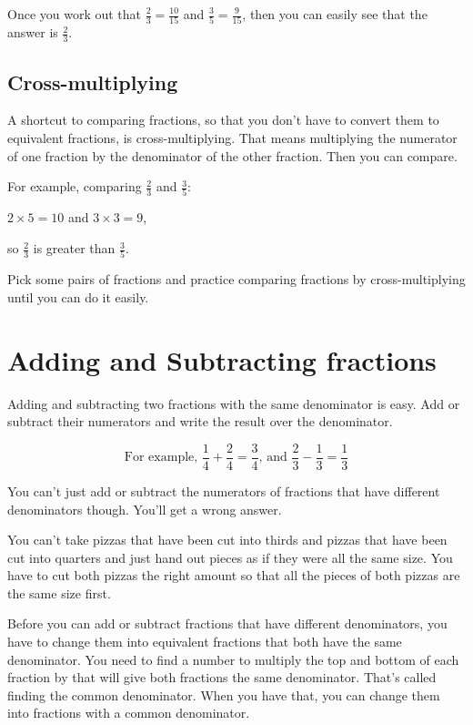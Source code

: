 \documentclass[16pt]{article}
\begin{document}
\begin{spacing}{1.25}
Once you work out that $\frac{2}{3} = \frac{10}{15}$ and $\frac{3}{5} = \frac{9}{15}$, then you can easily see that the answer is $\frac{2}{3}$.

\subsection*{Cross-multiplying}
A shortcut to comparing fractions, so that you don't have to convert them to equivalent fractions, is cross-multiplying. That means multiplying the numerator of one fraction by the denominator of the other fraction. Then you can compare.

\begin{doublespace}
For example, comparing $\frac{2}{3}$ and $\frac{3}{5}$:

$2 \times 5 = 10$ and $3 \times 3 = 9$,

so $\frac{2}{3}$ is greater than $\frac{3}{5}$.
\end{doublespace}

\vspace{28pt}
Pick some pairs of fractions and practice comparing fractions by cross-multiplying until you can do it easily.

\pagebreak

\section{Adding and Subtracting fractions}
Adding and subtracting two fractions with the same denominator is easy. Add or subtract their numerators and write the result over the denominator.

$$\text{For example, }\frac{1}{4} + \frac{2}{4} = \frac{3}{4}\text{, and }\frac{2}{3} - \frac{1}{3} = \frac{1}{3}$$

\vspace{28pt}
You can't just add or subtract the numerators of fractions that have different denominators though. You'll get a wrong answer.

You can't take pizzas that have been cut into thirds and pizzas that have been cut into quarters and just hand out pieces as if they were all the same size. You have to cut both pizzas the right amount so that all the pieces of both pizzas are the same size first.

Before you can add or subtract fractions that have different denominators, you have to change them into equivalent fractions that both have the same denominator. You need to find a number to multiply the top and bottom of each fraction by that will give both fractions the same denominator. That's called finding the common denominator. When you have that, you can change them into fractions with a common denominator.


\end{spacing}
\end{document}
